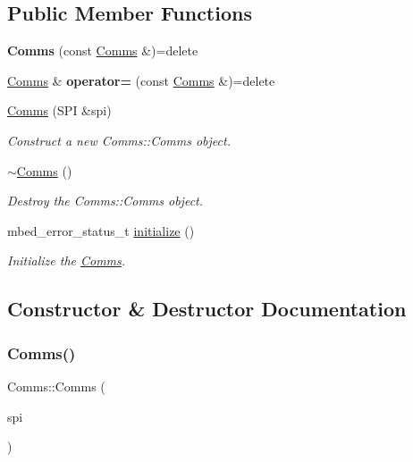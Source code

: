 \subsection*{Public Member Functions}
\begin{DoxyCompactItemize}
\item 
\mbox{\label{class_comms_a0460baf6818aab9ec44fb3e954700855}} 
{\bfseries Comms} (const \mbox{\hyperlink{class_comms}{Comms}} \&)=delete
\item 
\mbox{\label{class_comms_a0206d824817361e0f9f95b1d61d24754}} 
\mbox{\hyperlink{class_comms}{Comms}} \& {\bfseries operator=} (const \mbox{\hyperlink{class_comms}{Comms}} \&)=delete
\item 
\mbox{\hyperlink{class_comms_a84e488377d67eaf90750e8dc0c64f947}{Comms}} (S\+PI \&spi)
\begin{DoxyCompactList}\small\item\em Construct a new Comms\+::\+Comms object. \end{DoxyCompactList}\item 
\mbox{\hyperlink{class_comms_ad18d3a80a82d18d27b0de3b551e4f5fc}{$\sim$\+Comms}} ()
\begin{DoxyCompactList}\small\item\em Destroy the Comms\+::\+Comms object. \end{DoxyCompactList}\item 
mbed\+\_\+error\+\_\+status\+\_\+t \mbox{\hyperlink{class_comms_adf638922e6c53bef0fab4f482775f072}{initialize}} ()
\begin{DoxyCompactList}\small\item\em Initialize the \mbox{\hyperlink{class_comms}{Comms}}. \end{DoxyCompactList}\end{DoxyCompactItemize}


\subsection{Constructor \& Destructor Documentation}
\mbox{\label{class_comms_a84e488377d67eaf90750e8dc0c64f947}} 
\subsubsection{\texorpdfstring{Comms()}{Comms()}}
{\footnotesize\ttfamily Comms\+::\+Comms (\begin{DoxyParamCaption}\item[{S\+PI \&}]{spi }\end{DoxyParamCaption})}



